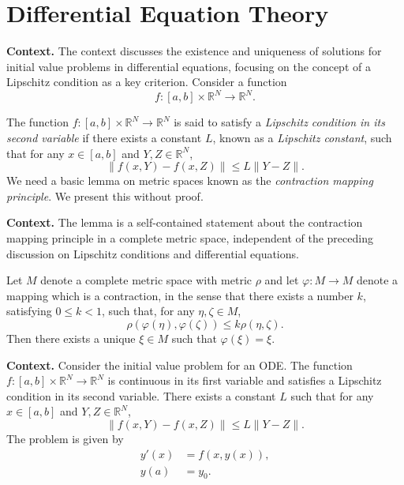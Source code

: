\section{Differential Equation Theory}

\noindent\textbf{Context.}
The context discusses the existence and uniqueness of solutions for initial value problems in differential equations, focusing on the concept of a Lipschitz condition as a key criterion. Consider a function
\[
f : [a, b] \times \mathbb{R}^N \to \mathbb{R}^N.
\]

\begin{definition}

  \label{def:110A}
  \uses{}
The function $f : [a, b] \times \mathbb{R}^N \to \mathbb{R}^N$ is said to satisfy a \emph{Lipschitz condition in its second variable} if there exists a constant $L$, known as a \emph{Lipschitz constant}, such that for any $x \in [a, b]$ and $Y, Z \in \mathbb{R}^N$,
\[
\| f(x, Y) - f(x, Z) \| \leq L \| Y - Z \|.
\]
We need a basic lemma on metric spaces known as the \emph{contraction mapping principle}. We present this without proof.
\end{definition}

\noindent\textbf{Context.}
The lemma is a self-contained statement about the contraction mapping principle in a complete metric space, independent of the preceding discussion on Lipschitz conditions and differential equations.

\begin{lemma}

  \label{lem:110B}
Let \( M \) denote a complete metric space with metric \( \rho \) and let
\( \varphi : M \to M \) denote a mapping which is a contraction, in the sense that
there exists a number \( k \), satisfying \( 0 \leq k < 1 \), such that, for any \( \eta, \zeta \in M \),
\[
\rho(\varphi(\eta), \varphi(\zeta)) \leq k \rho(\eta, \zeta).
\]
Then there exists a unique \( \xi \in M \) such that \( \varphi(\xi) = \xi \).
\end{lemma}

\noindent\textbf{Context.}
Consider the initial value problem for an ODE. The function \(f: [a, b] \times \mathbb{R}^N \to \mathbb{R}^N\) is continuous in its first variable and satisfies a Lipschitz condition in its second variable. There exists a constant \(L\) such that for any \(x \in [a, b]\) and \(Y, Z \in \mathbb{R}^N\),
\[
\|f(x, Y) - f(x, Z)\| \leq L \|Y - Z\|.
\]
The problem is given by
\begin{align}
    y'(x) &= f(x, y(x)), \tag{110a}\\
    y(a)  &= y_0. \tag{110b}
\end{align}

